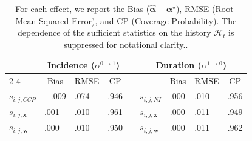 \begin{table}[!tbp]
\caption{For each effect, we report the Bias ($\hat{\bm{\alpha}}-\bm{\alpha}^\star$), RMSE (Root-Mean-Squared Error), and CP (Coverage Probability). The dependence of the sufficient statistics on the history $\mathscr{H}_t$ is suppressed for notational clarity..\label{tbl:simulation}} 
\begin{center}
\begin{tabular}{llllcllll}
\hline
\multicolumn{1}{l}{\bfseries }&\multicolumn{3}{c}{\bfseries Incidence ($\alpha^{0\rightarrow 1}$)}&\multicolumn{1}{l}{\bfseries }&\multicolumn{4}{c}{\bfseries Duration ($\alpha^{1\rightarrow 0}$)}\tabularnewline
\cline{2-4} \cline{6-9}
\multicolumn{1}{l}{}&\multicolumn{1}{c}{Bias}&\multicolumn{1}{c}{RMSE}&\multicolumn{1}{c}{CP}&\multicolumn{1}{c}{}&\multicolumn{1}{c}{}&\multicolumn{1}{c}{Bias}&\multicolumn{1}{c}{RMSE}&\multicolumn{1}{c}{CP}\tabularnewline
\hline
$s_{i,j,CCP}$&$-$.009&.074&.946&&$s_{i,j,NI}$&.000&.010&.956\tabularnewline
$s_{i,j,\bm{x}}$&.001&.010&.961&&$s_{i,j,\bm{x}}$&.000&.011&.949\tabularnewline
$s_{i,j,\bm{w}}$&.000&.010&.950&&$s_{i,j,\bm{w}}$&.000&.011&.962\tabularnewline
\hline
\end{tabular}\end{center}
\end{table}
